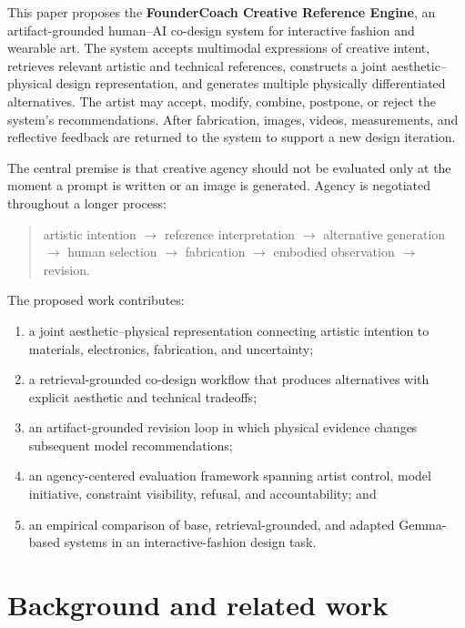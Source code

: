 \documentclass{article}
\begin{document}
This paper proposes the \textbf{FounderCoach Creative Reference Engine}, an
artifact-grounded human--AI co-design system for interactive fashion and
wearable art. The system accepts multimodal expressions of creative intent,
retrieves relevant artistic and technical references, constructs a joint
aesthetic--physical design representation, and generates multiple physically
differentiated alternatives. The artist may accept, modify, combine, postpone,
or reject the system's recommendations. After fabrication, images, videos,
measurements, and reflective feedback are returned to the system to support a
new design iteration.

The central premise is that creative agency should not be evaluated only at the
moment a prompt is written or an image is generated. Agency is negotiated
throughout a longer process:

\begin{quote}
artistic intention $\rightarrow$ reference interpretation $\rightarrow$
alternative generation $\rightarrow$ human selection $\rightarrow$
fabrication $\rightarrow$ embodied observation $\rightarrow$ revision.
\end{quote}

The proposed work contributes:

\begin{enumerate}[leftmargin=*]
    \item a joint aesthetic--physical representation connecting artistic
    intention to materials, electronics, fabrication, and uncertainty;
    \item a retrieval-grounded co-design workflow that produces alternatives
    with explicit aesthetic and technical tradeoffs;
    \item an artifact-grounded revision loop in which physical evidence changes
    subsequent model recommendations;
    \item an agency-centered evaluation framework spanning artist control,
    model initiative, constraint visibility, refusal, and accountability; and
    \item an empirical comparison of base, retrieval-grounded, and adapted
    Gemma-based systems in an interactive-fashion design task.
\end{enumerate}

\section{Background and related work}
\end{document}
